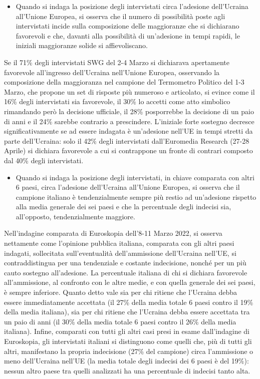 \documentclass[
]{book}
\providecommand{\tightlist}{%
  \setlength{\itemsep}{0pt}\setlength{\parskip}{0pt}}
\begin{document}
\begin{itemize}
\tightlist
\item
  Quando si indaga la posizione degli intervistati circa l'adesione dell'Ucraina all'Unione Europea, si osserva che il numero di possibilità poste agli intervistati incide sulla composizione delle maggioranze che si dichiarano favorevoli e che, davanti alla possibilità di un'adesione in tempi rapidi, le iniziali maggioranze solide si affievoliscano.
\end{itemize}

Se il 71\% degli intervistati SWG del 2-4 Marzo si dichiarava apertamente favorevole all'ingresso dell'Ucraina nell'Unione Europea, osservando la composizione della maggioranza nel campione del Termometro Politico del 1-3 Marzo, che propone un set di risposte più numeroso e articolato, si evince come il 16\% degli intervistati sia favorevole, il 30\% lo accetti come atto simbolico rimandando però la decisione ufficiale, il 28\% posporrebbe la decisione di un paio di anni e il 24\% sarebbe contrario a prescindere. L'iniziale forte sostegno decresce significativamente se ad essere indagata è un'adesione nell'UE in tempi stretti da parte dell'Ucraina: solo il 42\% degli intervistati dall'Euromedia Research (27-28 Aprile) si dichiara favorevole a cui si contrappone un fronte di contrari composto dal 40\% degli intervistati.

\begin{itemize}
\tightlist
\item
  Quando si indaga la posizione degli intervistati, in chiave comparata con altri 6 paesi, circa l'adesione dell'Ucraina all'Unione Europea, si osserva che il campione italiano è tendenzialmente sempre più restio ad un'adesione rispetto alla media generale dei sei paesi e che la percentuale degli indecisi sia, all'opposto, tendenzialmente maggiore.
\end{itemize}

Nell'indagine comparata di Euroskopia dell'8-11 Marzo 2022, si osserva nettamente come l'opinione pubblica italiana, comparata con gli altri paesi indagati, sollecitata sull'eventualità dell'ammissione dell'Ucraina nell'UE, si contraddistingua per una tendenziale e costante indecisione, nonché per un più cauto sostegno all'adesione. La percentuale italiana di chi si dichiara favorevole all'ammissione, al confronto con le altre medie, e con quella generale dei sei paesi, è sempre inferiore.
Quanto detto vale sia per chi ritiene che l'Ucraina debba essere immediatamente accettata (il 27\% della media totale 6 paesi contro il 19\% della media italiana), sia per chi ritiene che l'Ucraina debba essere accettata tra un paio di anni (il 30\% della media totale 6 paesi contro il 26\% della media italiana).
Infine, comparati con tutti gli altri casi presi in esame dall'indagine di Euroskopia, gli intervistati italiani si distinguono come quelli che, più di tutti gli altri, manifestano la propria indecisione (27\% del campione) circa l'ammissione o meno dell'Ucraina nell'UE (la media totale degli indecisi dei 6 paesi è del 19\%): nessun altro paese tra quelli analizzati ha una percentuale di indecisi tanto alta.
\end{document}
